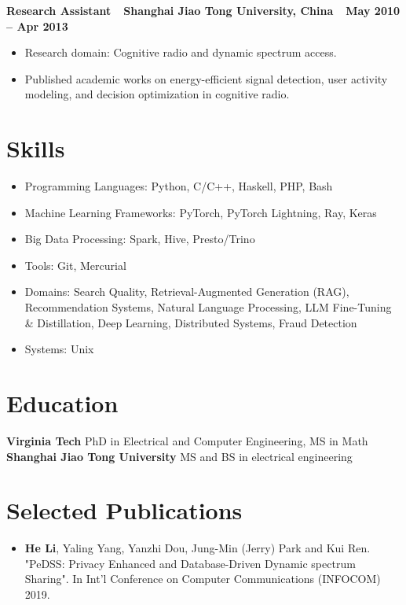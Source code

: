 \documentclass[line,margin]{res}
\begin{document}
\begin{resume}
\textbf{Research Assistant\ \textbar\ Shanghai Jiao Tong University, China\ \textbar\ May 2010 -- Apr 2013}
\begin{itemize}[noitemsep]
    \item Research domain: Cognitive radio and dynamic spectrum access.
    \item Published academic works on energy-efficient signal detection, user activity modeling, and decision optimization in cognitive radio.
\end{itemize}
    
\section{Skills}
\begin{itemize}\itemsep -2pt
    \item Programming Languages: Python, C/C++, Haskell, PHP, Bash
    \item Machine Learning Frameworks: PyTorch, PyTorch Lightning, Ray, Keras
    \item Big Data Processing: Spark, Hive, Presto/Trino
    \item Tools: Git, Mercurial
    \item Domains: Search Quality, Retrieval-Augmented Generation (RAG), Recommendation Systems, Natural Language Processing, LLM Fine-Tuning \& Distillation, Deep Learning, Distributed Systems, Fraud Detection
    \item Systems: Unix
\end{itemize}

\section{Education}
\textbf{Virginia Tech} PhD in Electrical and Computer Engineering, MS in Math\\
\textbf{Shanghai Jiao Tong University} MS and BS in electrical engineering

           
\section{Selected Publications}
\begin{itemize}[leftmargin=*]  \itemsep -2pt %

	\item \textbf{He Li}, Yaling Yang, Yanzhi Dou, Jung-Min (Jerry) Park and Kui Ren. "PeDSS: Privacy Enhanced and Database-Driven Dynamic spectrum Sharing". In  Int'l Conference on Computer Communications (INFOCOM) 2019.



\end{itemize}
\end{resume}
\end{document}
